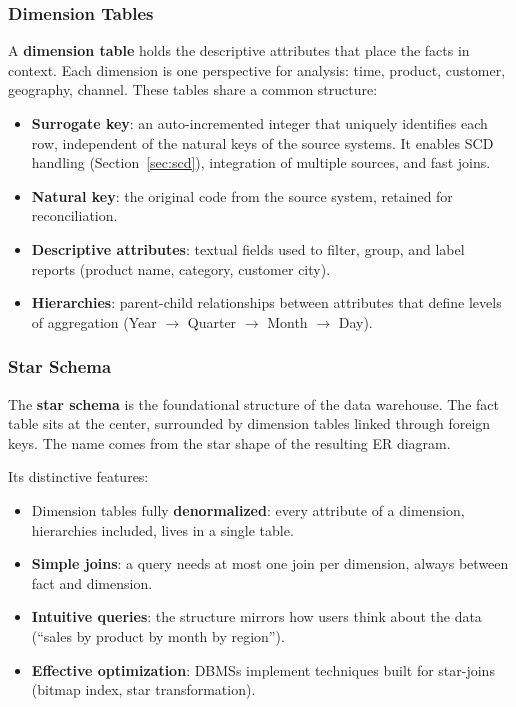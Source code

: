 \subsubsection{Dimension Tables}
\label{subsec:dimension-tables}

A \textbf{dimension table} holds the descriptive attributes that place the facts in context. Each dimension is one perspective for analysis: time, product, customer, geography, channel. These tables share a common structure:
\begin{itemize}
    \item \textbf{Surrogate key}: an auto-incremented integer that uniquely identifies each row, independent of the natural keys of the source systems. It enables SCD handling (Section~\ref{sec:scd}), integration of multiple sources, and fast joins.
    \item \textbf{Natural key}: the original code from the source system, retained for reconciliation.
    \item \textbf{Descriptive attributes}: textual fields used to filter, group, and label reports (product name, category, customer city).
    \item \textbf{Hierarchies}: parent-child relationships between attributes that define levels of aggregation (Year $\rightarrow$ Quarter $\rightarrow$ Month $\rightarrow$ Day).
\end{itemize}

\subsubsection{Star Schema}
\label{subsec:star-schema}

\begin{notebox}
The \textbf{star schema} is the foundational structure of the data warehouse. The fact table sits at the center, surrounded by dimension tables linked through foreign keys. The name comes from the star shape of the resulting ER diagram.

Its distinctive features:
\begin{itemize}
    \item Dimension tables fully \textbf{denormalized}: every attribute of a dimension, hierarchies included, lives in a single table.
    \item \textbf{Simple joins}: a query needs at most one join per dimension, always between fact and dimension.
    \item \textbf{Intuitive queries}: the structure mirrors how users think about the data (``sales by product by month by region'').
    \item \textbf{Effective optimization}: DBMSs implement techniques built for star-joins (bitmap index, star transformation).
\end{itemize}
\end{notebox}


